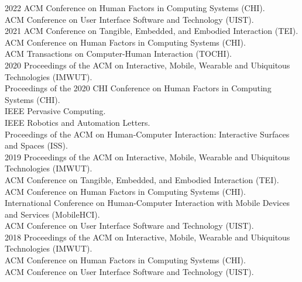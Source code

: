     \begin{cvreviews}
      \cvreview
        {2022}
        {ACM Conference on Human Factors in Computing Systems (CHI).\\
        ACM Conference on User Interface Software and Technology (UIST). \\}
      \cvreview
        {2021}
        {ACM Conference on Tangible, Embedded, and Embodied Interaction (TEI).\\
        ACM Conference on Human Factors in Computing Systems (CHI).\\
        ACM Transactions on Computer-Human Interaction (TOCHI).\\}
      \cvreview
        {2020}
        {Proceedings of the ACM on Interactive, Mobile, Wearable and Ubiquitous Technologies (IMWUT).\\
        Proceedings of the 2020 CHI Conference on Human Factors in Computing Systems (CHI).\\
        IEEE Pervasive Computing.\\
        IEEE Robotics and Automation Letters.\\
        Proceedings of the ACM on Human-Computer Interaction: Interactive Surfaces and Spaces (ISS).\\}
      \cvreview
        {2019}
        {Proceedings of the ACM on Interactive, Mobile, Wearable and Ubiquitous Technologies (IMWUT).\\
        ACM Conference on Tangible, Embedded, and Embodied Interaction (TEI).\\
        ACM Conference on Human Factors in Computing Systems (CHI).\\
        International Conference on Human-Computer Interaction with Mobile Devices and Services (MobileHCI).\\
        ACM Conference on User Interface Software and Technology (UIST). \\}
      \cvreview
        {2018}
        {Proceedings of the ACM on Interactive, Mobile, Wearable and Ubiquitous Technologies (IMWUT).\\
        ACM Conference on Human Factors in Computing Systems (CHI).\\
        ACM Conference on User Interface Software and Technology (UIST). \\}
    \end{cvreviews}